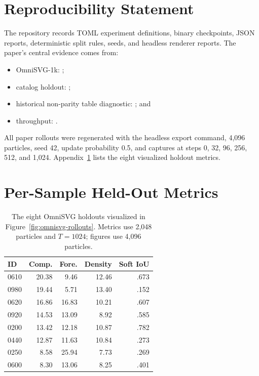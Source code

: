 \documentclass[sigconf,nonacm]{acmart}
\begin{document}
\section*{Reproducibility Statement}

The repository records TOML experiment definitions, binary checkpoints, JSON
reports, deterministic split rules, seeds, and headless renderer reports. The
paper's central evidence comes from:
\begin{itemize}
  \item OmniSVG-1k: ;
  \item catalog holdout: ;
  \item historical non-parity table diagnostic: ; and
  \item throughput: .
\end{itemize}
All paper rollouts were regenerated with the headless export command, 4,096
particles, seed 42, update probability 0.5, and captures
at steps 0, 32, 96, 256, 512, and 1,024. Appendix~\ref{app:metrics} lists the
eight visualized holdout metrics.

\appendix

\section{Per-Sample Held-Out Metrics}
\label{app:metrics}

\begin{table}[t]
\caption{The eight OmniSVG holdouts visualized in
Figure~\ref{fig:omnisvg-rollouts}. Metrics use 2,048
particles and $T=1024$; figures use 4,096 particles.}
\label{tab:per-sample}
\centering
\scriptsize
\begin{tabular}{lrrrr}
\toprule
ID & Comp. & Fore. & Density & Soft IoU \\
\midrule
0610 & 20.38 & 9.46 & 12.46 & .673 \\
0980 & 19.44 & 5.71 & 13.40 & .152 \\
0620 & 16.86 & 16.83 & 10.21 & .607 \\
0920 & 14.53 & 13.09 & 8.92 & .585 \\
0200 & 13.42 & 12.18 & 10.87 & .782 \\
0440 & 12.87 & 11.63 & 10.84 & .273 \\
0250 & 8.58 & 25.94 & 7.73 & .269 \\
0600 & 8.30 & 13.06 & 8.25 & .401 \\
\bottomrule
\end{tabular}
\end{table}
\end{document}
